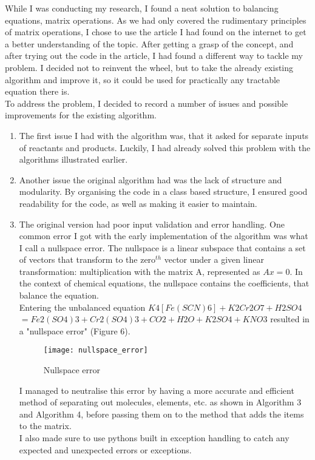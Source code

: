 \documentclass[a4paper,12pt]{article}
\begin{document}
While I was conducting my research, I found a neat solution to balancing equations, matrix operations. As we had only covered the rudimentary principles of matrix operations, I chose to use the article I had found on the internet to get a better understanding of the topic. After getting a grasp of the concept, and after trying out the code in the article, I had found a different way to tackle my problem. I decided not to reinvent the wheel, but to take the already existing algorithm and improve it, so it could be used for practically any tractable equation there is.\\
To address the problem, I decided to record a number of issues and possible improvements for the existing algorithm.

\begin{enumerate}
\item The first issue I had with the algorithm was, that it asked for separate inputs of reactants and products. Luckily, I had already solved this problem with the algorithms illustrated earlier.
\item Another issue the original algorithm had was the lack of structure and modularity. By organising the code in a class based structure, I ensured good readability for the code, as well as making it easier to maintain.
\item The original version had poor input validation and error handling. One common error I got with the early implementation of the algorithm was what I call a nullspace error. The nullspace is a linear subspace that contains a set of vectors that transform to the zero$^{th}$ vector under a given linear transformation: multiplication with the matrix A, represented as $ Ax = 0$. In the context of chemical equations, the nullspace contains the coefficients, that balance the equation.\\
Entering the unbalanced equation $ K4[Fe(SCN)6] + K2Cr2O7 + H2SO4$\\ $ = Fe2(SO4)3 + Cr2(SO4)3 + CO2 + H2O + K2SO4 + KNO3$ resulted in a "nullspace error" (Figure 6). 

\newpage

\begin{figure} [h]
	\centering
	\texttt{[image: nullspace\_error]}
	\caption{Nullspace error}
	\label{fig:nullspace_error}
\end{figure}

I managed to neutralise this error by having a more accurate and efficient method of separating out molecules, elements, etc. as shown in Algorithm 3 and Algorithm 4, before passing them on to the method that adds the items to the matrix.\\
I also made sure to use pythons built in exception handling to catch any expected and unexpected errors or exceptions.
\end{enumerate}
\end{document}
